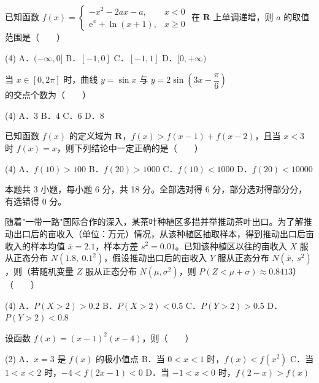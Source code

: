 已知函数 $f(x)=\begin{cases}-x^{2}-2ax-a,&x<0\\ \mathrm{e}^{x}+\ln(x+1),&x\ge0\end{cases}$ 在 $\mathbf R$ 上单调递增，则 $a$ 的取值范围是（　　）

\begin{gkopts}(4)
\task A．$(-\infty,0]$
\task B．$[-1,0]$
\task C．$[-1,1]$
\task D．$[0,+\infty)$
\end{gkopts}

当 $x\in[0,2\pi]$ 时，曲线 $y=\sin x$ 与 $y=2\sin\left(3x-\dfrac{\pi}{6}\right)$ 的交点个数为（　　）

\begin{gkopts}(4)
\task A．$3$
\task B．$4$
\task C．$6$
\task D．$8$
\end{gkopts}

已知函数 $f(x)$ 的定义域为 $\mathbf R$，$f(x)>f(x-1)+f(x-2)$，且当 $x<3$ 时 $f(x)=x$，则下列结论中一定正确的是（　　）

\begin{gkopts}(4)
\task A．$f(10)>100$
\task B．$f(20)>1000$
\task C．$f(10)<1000$
\task D．$f(20)<10000$
\end{gkopts}

\par\medskip


\begin{gktip}
本题共 3 小题，每小题 6 分，共 18 分。全部选对得 6 分，部分选对得部分分，有选错得 0 分。
\end{gktip}

随着"一带一路"国际合作的深入，某茶叶种植区多措并举推动茶叶出口。为了解推动出口后的亩收入（单位：万元）情况，从该种植区抽取样本，得到推动出口后亩收入的样本均值 $\bar x=2.1$，样本方差 $s^{2}=0.01$。已知该种植区以往的亩收入 $X$ 服从正态分布 $N\left(1.8,\ 0.1^{2}\right)$，假设推动出口后的亩收入 $Y$ 服从正态分布 $N\left(\bar x,\ s^{2}\right)$，则（若随机变量 $Z$ 服从正态分布 $N\left(\mu,\sigma^{2}\right)$，则 $P(Z<\mu+\sigma)\approx0.8413$）（　　）

\begin{gkopts}(4)
\task A．$P(X>2)>0.2$
\task B．$P(X>2)<0.5$
\task C．$P(Y>2)>0.5$
\task D．$P(Y>2)<0.8$
\end{gkopts}

设函数 $f(x)=(x-1)^{2}(x-4)$，则（　　）

\begin{gkopts}(2)
\task A．$x=3$ 是 $f(x)$ 的极小值点
\task B．当 $0<x<1$ 时，$f(x)<f\left(x^{2}\right)$
\task C．当 $1<x<2$ 时，$-4<f(2x-1)<0$
\task D．当 $-1<x<0$ 时，$f(2-x)>f(x)$
\end{gkopts}

